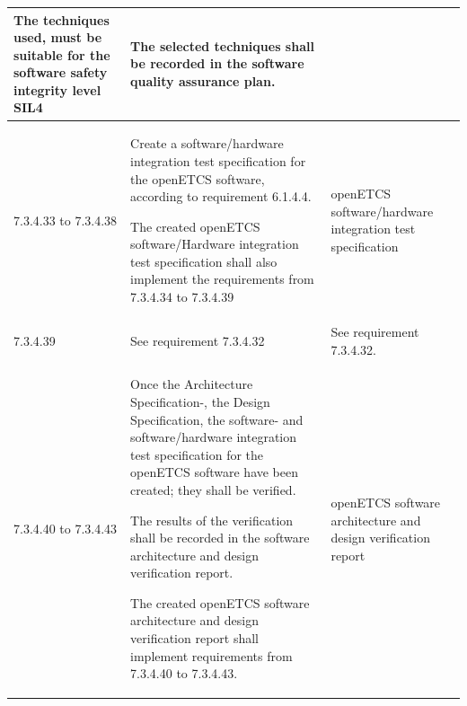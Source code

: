\documentclass{template/openetcs_report}
\begin{document}
{\begin{longtable}{|p{2cm}|p{9cm}|p{3cm}|}
The techniques used, must be suitable for the software safety integrity level SIL4
& The selected techniques shall be recorded in the software quality assurance plan.\\ 
\hline
7.3.4.33 to 7.3.4.38 & Create a software/hardware integration test specification for the openETCS software, according to requirement 6.1.4.4.

The created openETCS software/Hardware integration test specification shall also implement the requirements from 7.3.4.34 to 7.3.4.39
& openETCS software/hardware integration test specification\\ 
\hline
7.3.4.39 & See requirement 7.3.4.32 & See requirement 7.3.4.32.\\ 
\hline
7.3.4.40 to 7.3.4.43 & Once the Architecture Specification-, the Design Specification, the software- and  software/hardware integration test specification for the openETCS software have been created; they shall be verified.

The results of the verification shall be recorded in the software architecture and design verification report.

The created openETCS software architecture and design verification report shall implement requirements from 7.3.4.40 to 7.3.4.43.
& openETCS software architecture and design verification report \\ 
\hline
\end{longtable}}
\end{document}
